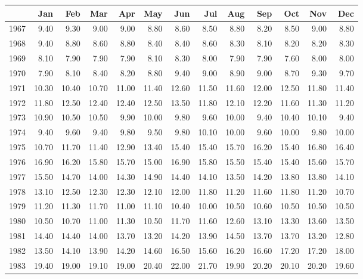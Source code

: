 \begin{longtable}{rrrrrrrrrrrrr}
  \hline
 & Jan & Feb & Mar & Apr & May & Jun & Jul & Aug & Sep & Oct & Nov & Dec \\ 
  \hline
1967 & 9.40 & 9.30 & 9.00 & 9.00 & 8.80 & 8.60 & 8.50 & 8.80 & 8.20 & 8.50 & 9.00 & 8.80 \\ 
  1968 & 9.40 & 8.80 & 8.60 & 8.80 & 8.40 & 8.40 & 8.60 & 8.30 & 8.10 & 8.20 & 8.20 & 8.30 \\ 
  1969 & 8.10 & 7.90 & 7.90 & 7.90 & 8.10 & 8.30 & 8.00 & 7.90 & 7.90 & 7.60 & 8.00 & 8.00 \\ 
  1970 & 7.90 & 8.10 & 8.40 & 8.20 & 8.80 & 9.40 & 9.00 & 8.90 & 9.00 & 8.70 & 9.30 & 9.70 \\ 
  1971 & 10.30 & 10.40 & 10.70 & 11.00 & 11.40 & 12.60 & 11.50 & 11.60 & 12.00 & 12.50 & 11.80 & 11.40 \\ 
  1972 & 11.80 & 12.50 & 12.40 & 12.40 & 12.50 & 13.50 & 11.80 & 12.10 & 12.20 & 11.60 & 11.30 & 11.20 \\ 
  1973 & 10.90 & 10.50 & 10.50 & 9.90 & 10.00 & 9.80 & 9.60 & 10.00 & 9.40 & 10.40 & 10.10 & 9.40 \\ 
  1974 & 9.40 & 9.60 & 9.40 & 9.80 & 9.50 & 9.80 & 10.10 & 10.00 & 9.60 & 10.00 & 9.80 & 10.00 \\ 
  1975 & 10.70 & 11.70 & 11.40 & 12.90 & 13.40 & 15.40 & 15.40 & 15.70 & 16.20 & 15.40 & 16.80 & 16.40 \\ 
  1976 & 16.90 & 16.20 & 15.80 & 15.70 & 15.00 & 16.90 & 15.80 & 15.50 & 15.40 & 15.40 & 15.60 & 15.70 \\ 
  1977 & 15.50 & 14.70 & 14.00 & 14.30 & 14.90 & 14.40 & 14.10 & 13.50 & 14.20 & 13.80 & 13.80 & 14.10 \\ 
  1978 & 13.10 & 12.50 & 12.30 & 12.30 & 12.10 & 12.00 & 11.80 & 11.20 & 11.60 & 11.80 & 11.20 & 10.70 \\ 
  1979 & 11.20 & 11.30 & 11.70 & 11.00 & 11.10 & 10.40 & 10.00 & 10.50 & 10.60 & 10.50 & 10.50 & 10.50 \\ 
  1980 & 10.50 & 10.70 & 11.00 & 11.30 & 10.50 & 11.70 & 11.60 & 12.60 & 13.10 & 13.30 & 13.60 & 13.50 \\ 
  1981 & 14.40 & 14.40 & 14.00 & 13.70 & 13.20 & 14.20 & 13.90 & 14.50 & 13.70 & 13.70 & 13.20 & 12.80 \\ 
  1982 & 13.50 & 14.10 & 13.90 & 14.20 & 14.60 & 16.50 & 15.60 & 16.20 & 16.60 & 17.20 & 17.20 & 18.00 \\ 
  1983 & 19.40 & 19.00 & 19.10 & 19.00 & 20.40 & 22.00 & 21.70 & 19.90 & 20.20 & 20.10 & 20.20 & 19.60 \\ 

\end{longtable}

